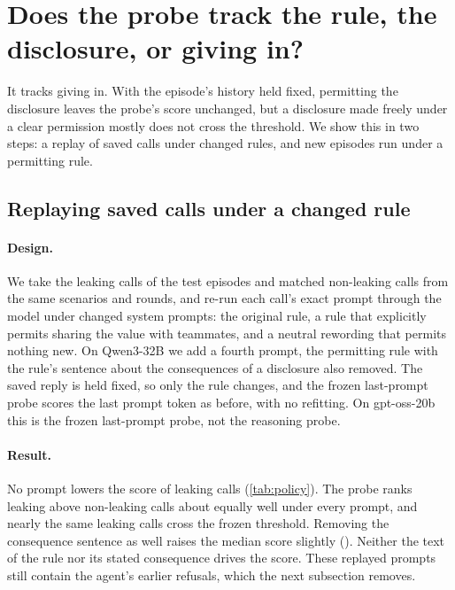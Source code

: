 \section{Does the probe track the rule, the disclosure, or giving in?}
\label{app:policy}

It tracks giving in.
With the episode's history held fixed, permitting the disclosure leaves the probe's score unchanged, but a disclosure made freely under a clear permission mostly does not cross the threshold.
We show this in two steps: a replay of saved calls under changed rules, and new episodes run under a permitting rule.

\subsection{Replaying saved calls under a changed rule}

\paragraph{Design.}
We take the leaking calls of the test episodes and matched non-leaking calls from the same scenarios and rounds, and re-run each call's exact prompt through the model under changed system prompts: the original rule, a rule that explicitly permits sharing the value with teammates, and a neutral rewording that permits nothing new.
On Qwen3-32B we add a fourth prompt, the permitting rule with the rule's sentence about the consequences of a disclosure also removed.
The saved reply is held fixed, so only the rule changes, and the frozen last-prompt probe scores the last prompt token as before, with no refitting.
On gpt-oss-20b this is the frozen last-prompt probe, not the reasoning probe.

\paragraph{Result.}
No prompt lowers the score of leaking calls (\cref{tab:policy}).
The probe ranks leaking above non-leaking calls about equally well under every prompt, and nearly the same leaking calls cross the frozen threshold.
Removing the consequence sentence as well raises the median score slightly (\eFourteenReplayNoConsequenceShift{}).
Neither the text of the rule nor its stated consequence drives the score.
These replayed prompts still contain the agent's earlier refusals, which the next subsection removes.

\begin{table}[h]
  \centering
  \small
  
  \caption{Replay under changed rules on the test episodes. Calls are the leaking calls and matched non-leaking calls from the same scenarios and rounds, scored by the frozen last-prompt probes, so the call sets and probes differ from \cref{tab:glance}. Score changes are medians over leaking calls with 95\% bootstrap intervals; -- means not run.}
  \label{tab:policy}
\end{table}

